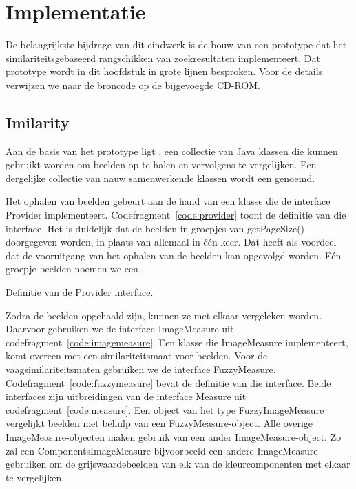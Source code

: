 \chapter{Implementatie}

De belangrijkste bijdrage van dit eindwerk is de bouw van een prototype
dat het similariteitsgebaseerd rangschikken van zoekresultaten implementeert.
Dat prototype wordt in dit hoofdstuk in grote lijnen besproken. Voor de details
verwijzen we naar de broncode op de bijgevoegde CD-ROM.

\section{Imilarity}

Aan de basis van het prototype ligt , een collectie van Java klassen 
die kunnen gebruikt worden om beelden op te halen en vervolgens te vergelijken. Een 
dergelijke collectie van nauw samenwerkende klassen wordt een  genoemd. 

Het ophalen van beelden gebeurt aan de hand van een klasse die de interface 
{\klassefont Provider} implementeert. Codefragment~\ref{code:provider} toont de definitie
van die interface. Het is duidelijk dat de beelden in groepjes van 
{\klassefont getPageSize()} doorgegeven worden, in plaats van allemaal in \'e\'en keer. 
Dat heeft als voordeel dat de vooruitgang van het ophalen van de beelden kan 
opgevolgd worden. E\'en groepje beelden noemen we een .

\begin{code}[bp]
\vspace{5pt}
\begin{lgrind}

\end{lgrind}
\vspace{5pt}
\caption{\label{code:provider}Definitie van de {\klassefont Provider} interface.}
\end{code}

Zodra de beelden opgehaald zijn, kunnen ze met elkaar vergeleken worden. Daarvoor
gebruiken we de interface {\klassefont ImageMeasure} uit 
codefragment~\ref{code:imagemeasure}. Een klasse die {\klassefont ImageMeasure} 
implementeert, komt overeen met een similariteitsmaat voor beelden. Voor de 
vaagsimilariteitsmaten gebruiken we de interface {\klassefont FuzzyMeasure}.
Codefragment~\ref{code:fuzzymeasure} bevat de definitie van die interface.
Beide interfaces zijn uitbreidingen van de interface {\klassefont Measure}
uit codefragment~\ref{code:measure}. 
Een object van het type {\klassefont FuzzyImageMeasure} vergelijkt beelden
met behulp van een {\klassefont FuzzyMeasure}-object. Alle overige
{\klassefont ImageMeasure}-objecten maken gebruik van een ander 
{\klassefont ImageMeasure}-object. Zo zal een {\klassefont ComponentsImageMeasure}
bijvoorbeeld een andere {\klassefont ImageMeasure} gebruiken om de grijswaardebeelden
van elk van de kleurcomponenten met elkaar te vergelijken. 

